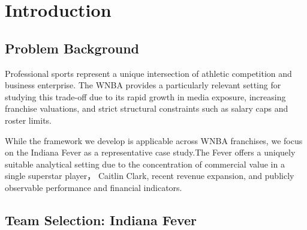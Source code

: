 \documentclass{mcmthesis}
\renewcommand{\contentsname}{\hspace*{\fill}\Large\bfseries Contents \hspace*{\fill}}
\begin{document}
\begin{abstract}
Key recommendations include implementing a 32-minute cap on Clark's playing time, securing key player injury insurance (\$18M coverage), and locking in sponsor agreements before potential nearby expansion.

\begin{keywords}
Sports Analytics; WNBA; Dynamic Decision Making; Player Valuation; Capital Structure Optimization; Geographic Competition; Mixed-Integer Programming; Monte Carlo Simulation
\end{keywords}

\end{abstract}

\maketitle

\tableofcontents        %
\thispagestyle{empty}

\newpage

\section{Introduction}


\subsection{Problem Background}    %
Professional sports represent a unique intersection of athletic competition and business enterprise. The WNBA provides a particularly relevant setting for studying this trade-off due to its rapid growth in media exposure, increasing franchise valuations, and strict structural constraints such as salary caps and roster limits.

While the framework we develop is applicable across WNBA franchises, we focus on the Indiana Fever as a representative case study.The Fever offers a uniquely suitable analytical setting due to the concentration of commercial value in a single superstar player， Caitlin Clark, recent revenue expansion, and publicly observable performance and financial indicators.

\subsection{Team Selection: Indiana Fever}   %
\end{document}
